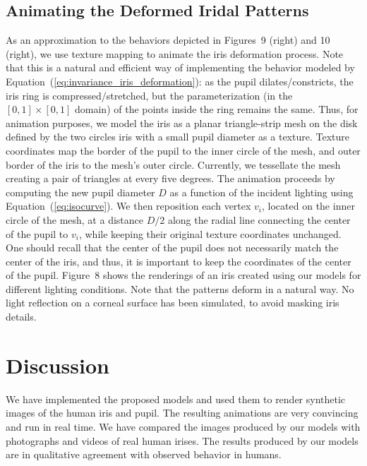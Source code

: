 \documentclass{dnacm} %
\begin{document}
%
\subsection{Animating the Deformed Iridal Patterns}
\label{sec:iris_animation}
%
As an approximation to the behaviors depicted in Figures~9 (right) and
10 (right), we use texture mapping to animate the iris deformation
process. Note that this is a natural and efficient way of implementing
the behavior modeled by Equation~(\ref{eq:invariance_iris_deformation}):
as the pupil dilates/constricts, the iris ring is compressed/stretched,
but the parameterization (in the $[0,1] \times [0,1]$ domain) of the
points inside the ring remains the same. Thus, for animation purposes,
we model the iris as a planar triangle-strip mesh on the disk defined by
the two circles %
iris with a small pupil diameter as a texture. Texture coordinates map
the border of the pupil to the inner circle of the mesh, and outer
border of the iris to the mesh's outer circle. Currently, we tessellate
the mesh creating a pair of triangles at every five degrees. The
animation proceeds by computing the new pupil diameter $D$ as a function
of the incident lighting using Equation~(\ref{eq:isocurve}). We then
reposition each vertex $v_i$, located on the inner circle of the mesh,
at a distance $D/2$ along the radial line connecting the center of the
pupil to $v_i$, while keeping their original texture coordinates
unchanged. One should recall that the center of the pupil does not
necessarily match the center of the iris, and thus, it is important to
keep the coordinates of the center of the pupil. Figure~8 shows the
renderings of an iris created using our models for different lighting
conditions. Note that the patterns deform in a natural way. No light
reflection on a corneal surface has been simulated, to avoid masking
iris details.


\section{Discussion}
\label{sec:results}

We have implemented the proposed models and used them to render
synthetic images of the human iris and pupil. The resulting animations
are very convincing and run in real time. We have compared the images
produced by our models with photographs and videos of real human irises.
The results produced by our models are in qualitative agreement with
observed behavior in humans.
 
\end{document}
